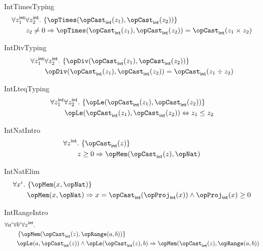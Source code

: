\documentclass[11pt, a4paper, oneside]{article}
\begin{document}
\begin{axioms}
\item[IntTimesTyping] \[
        \begin{aligned}
            &\forall z_1^\int \forall z_2^\int.\, \st{ \opTimes(\opCast_\int(z_1), \opCast_\int(z_2)) } \\
            &\qquad z_2 \neq 0 \imp \opTimes(\opCast_\int(z_1), \opCast_\int(z_2)) = \opCast_\int(z_1 \times z_2)
        \end{aligned}
    \]

\item[IntDivTyping] \[
        \begin{aligned}
            &\forall z_1^\int \forall z_2^\int.\, \st{ \opDiv(\opCast_\int(z_1), \opCast_\int(z_2)) } \\
            &\qquad \opDiv(\opCast_\int(z_1), \opCast_\int(z_2)) = \opCast_\int(z_1 \div z_2)
        \end{aligned}
    \]

\item[IntLteqTyping] \[
        \begin{aligned}
            &\forall z_1^\int \forall z_2^\int.\, \st{ \opLe(\opCast_\int(z_1), \opCast_\int(z_2)) } \\
            &\qquad \opLe(\opCast_\int(z_1), \opCast_\int(z_2)) \eqv z_1 \le z_2
        \end{aligned}
    \]

\item[IntNatIntro] \[
        \begin{aligned}
            &\forall z^\int.\, \st{ \opCast_\int(z) } \\
            &\qquad z \ge 0 \imp \opMem(\opCast_\int(z), \opNat)
        \end{aligned}
    \]

\item[IntNatElim] \[
        \begin{aligned}
            &\forall x^\idv.\, \st{ \opMem(x, \opNat) } \\
            &\qquad \opMem(x, \opNat) \imp x = \opCast_\int(\opProj_\int(x)) \wedge \opProj_\int(x) \ge 0
        \end{aligned}
    \]

\item[IntRangeIntro] \[
        \begin{aligned}
            &\forall a^\idv \forall b^\idv \forall z^\int. \\
            &\qquad \st{ \opMem(\opCast_\int(z), \opRange(a, b)) } \\
            &\qquad \opLe(a, \opCast_\int(z)) \wedge \opLe(\opCast_\int(z), b) \imp \opMem(\opCast_\int(z), \opRange(a, b))
        \end{aligned}
    \]


\end{axioms}
\end{document}
